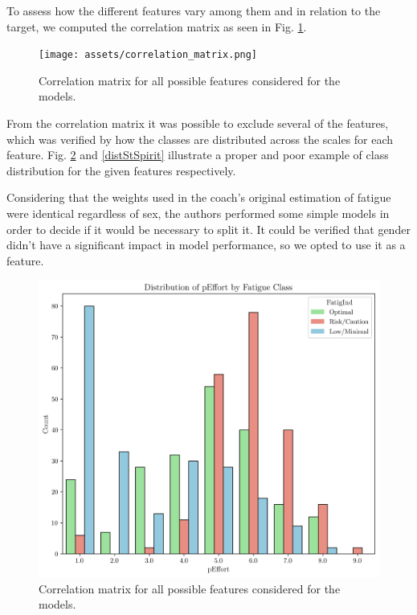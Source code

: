 \documentclass[conference]{IEEEtran}
\begin{document}
To assess how the different features vary among them and in relation to the target, we computed the correlation matrix as seen in Fig. \ref{fig:correlationMatrix}.

\begin{figure}[H]
    \centering
    \texttt{[image: assets/correlation\_matrix.png]}
    \caption{Correlation matrix for all possible features considered for the models.}
    \label{fig:correlationMatrix}
\end{figure} %

From the correlation matrix it was possible to exclude several of the features, which was verified by how the classes are distributed across the scales for each feature. Fig. \ref{distpEffort} and \ref{distStSpirit} illustrate a proper and poor example of class distribution for the given features respectively.

Considering that the weights used in the coach's original estimation of fatigue were identical regardless of sex, the authors performed some simple models in order to decide if it would be necessary to split it. It could be verified that gender didn't have a significant impact in model performance, so we opted to use it as a feature. 

\begin{figure}[H]
    \centering
    \includegraphics[width=1\linewidth]{assets/distribution_pEffort.png}
    \caption{Correlation matrix for all possible features considered for the models.}
    \label{distpEffort}
\end{figure} %
\end{document}
